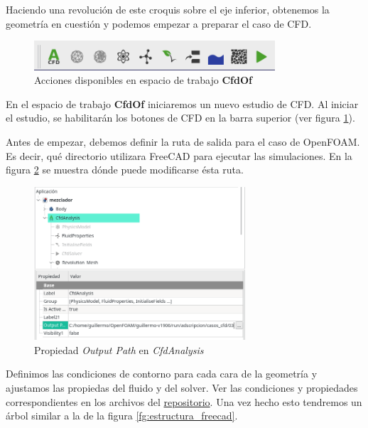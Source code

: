 \documentclass[oneside,a4paper,spanish,links]{amca}
\begin{document}
Haciendo una revolución de este croquis sobre el eje inferior, obtenemos la geometría en cuestión y podemos empezar a preparar el caso de CFD.

\begin{figure}[htb]
	\centerline{\includegraphics[width=0.8\textwidth]{Figuras/02_BOTONES_CFD.png}} \caption{Acciones disponibles en espacio de trabajo \textbf{CfdOf}} \label{fg:botones_cfd}
\end{figure}

En el espacio de trabajo \textbf{CfdOf} iniciaremos un nuevo estudio de CFD. Al iniciar el estudio, se habilitarán los botones de CFD en la barra superior (ver figura \ref{fg:botones_cfd}).

Antes de empezar, debemos definir la ruta de salida para el caso de OpenFOAM. Es decir, qué directorio utilizara FreeCAD para ejecutar las simulaciones. En la figura \ref{fg:fc_outputpath} se muestra dónde puede modificarse ésta ruta.

\begin{figure}[htb]
	\centerline{\includegraphics[width=0.7\textwidth]{Figuras/02_OUTPUTPATH.png}} \caption{Propiedad \textit{Output Path} en \textit{CfdAnalysis}} \label{fg:fc_outputpath}
\end{figure}



Definimos las condiciones de contorno para cada cara de la geometría y ajustamos las propiedas del fluido y del solver. Ver las condiciones y propiedades correspondientes en los archivos del \href{https://github.com/guillerolle/casos_cfd/tree/master/03}{repositorio}. Una vez hecho esto tendremos un árbol similar a la de la figura \ref{fg:estructura_freecad}.
\end{document}

